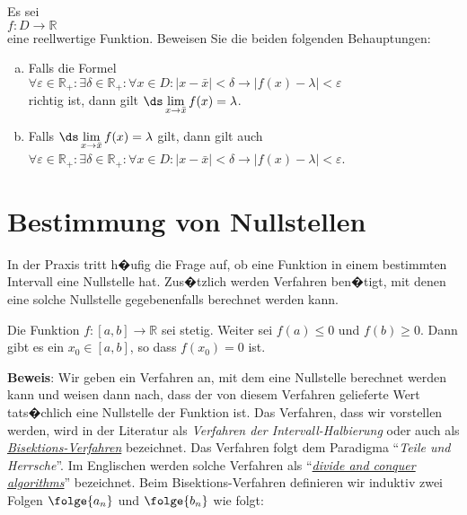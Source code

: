 \exercise
Es sei \\[0.2cm]
\hspace*{1.3cm}
$f: D \rightarrow \mathbb{R}$
\\[0.2cm]
eine reellwertige Funktion.  Beweisen Sie die beiden folgenden Behauptungen:
\begin{enumerate}[(a)]
\item Falls die Formel
      \\[0.2cm]
      \hspace*{1.3cm}
      $\forall \varepsilon\in\mathbb{R}_+: \exists\delta\in\mathbb{R}_+: \forall x\in D: |x-\bar{x}|<\delta \rightarrow |f(x) - \lambda| < \varepsilon$
      \\[0.2cm]
      richtig ist, dann gilt
      $\ds \lim\limits_{x\rightarrow\bar{x}} f(x) = \lambda$.
\item Falls  $\ds \lim\limits_{x\rightarrow\bar{x}} f(x) = \lambda$ gilt, dann gilt auch
      \\[0.2cm]
      \hspace*{1.3cm}
      $\forall \varepsilon\in\mathbb{R}_+: \exists\delta\in\mathbb{R}_+: \forall x\in D: |x-\bar{x}|<\delta \rightarrow |f(x) - \lambda| < \varepsilon$.
      \eox
\end{enumerate}



\section{Bestimmung von Nullstellen}
In der Praxis tritt h�ufig die Frage auf, ob eine Funktion in einem bestimmten Intervall
eine Nullstelle hat.  Zus�tzlich werden Verfahren ben�tigt, mit denen eine solche
Nullstelle gegebenenfalls berechnet werden kann.

\begin{Satz}
Die Funktion $f:[a,b] \rightarrow \mathbb{R}$ sei stetig.  Weiter sei $f(a) \leq 0$ und
$f(b) \geq 0$.  Dann gibt es ein $x_0 \in [a,b]$, so dass $f(x_0) = 0$ ist.
\end{Satz}

\noindent
\textbf{Beweis}: Wir geben ein Verfahren an, mit dem eine Nullstelle berechnet werden kann
und weisen dann nach, dass der von diesem Verfahren gelieferte Wert tats�chlich eine
Nullstelle der Funktion ist.  Das Verfahren, dass wir vorstellen werden, wird in der
Literatur als \emph{Verfahren der Intervall-Halbierung} oder auch als
\href{http://en.wikipedia.org/wiki/Bisection_method}{\emph{Bisektions-Verfahren}} bezeichnet.  
Das Verfahren folgt dem Paradigma ``\emph{Teile und Herrsche}''.  Im Englischen werden solche
Verfahren als
``\href{http://en.wikipedia.org/wiki/Divide_and_conquer_algorithms}{\emph{divide and conquer algorithms}}''
bezeichnet.
Beim Bisektions-Verfahren definieren wir induktiv zwei Folgen $\folge{a_n}$ und
$\folge{b_n}$ wie folgt:
\pagebreak

